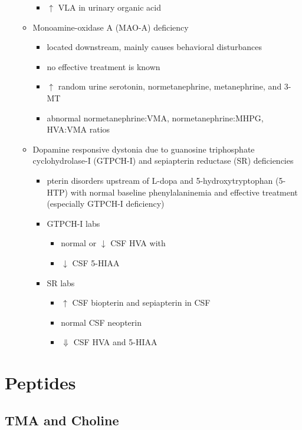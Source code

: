 \documentclass{scrartcl}
\begin{document}
\begin{itemize}
\begin{itemize}
\begin{itemize}
\item \(\uparrow\) VLA in urinary organic acid
\end{itemize}
\item Monoamine-oxidase A (MAO-A) deficiency
\begin{itemize}
\item located downstream, mainly causes behavioral disturbances
\item no effective treatment is known
\item \(\uparrow\) random urine serotonin, normetanephrine, metanephrine, and 3-MT
\item abnormal normetanephrine:VMA, normetanephrine:MHPG, HVA:VMA ratios
\end{itemize}
\item Dopamine responsive dystonia due to guanosine triphosphate cyclohydrolase-I (GTPCH-I) and
sepiapterin reductase (SR) deficiencies
\begin{itemize}
\item pterin disorders upstream of L-dopa and
5-hydroxytryptophan (5-HTP) with normal baseline
phenylalaninemia and effective treatment (especially GTPCH-I
deficiency)
\item GTPCH-I labs
\begin{itemize}
\item normal or \(\downarrow\) CSF HVA with
\item \(\downarrow\) CSF 5-HIAA
\end{itemize}
\item SR labs
\begin{itemize}
\item \(\uparrow\) CSF biopterin and sepiapterin in CSF
\item normal CSF neopterin
\item \(\Downarrow\) CSF HVA and 5-HIAA
\end{itemize}
\end{itemize}
\end{itemize}
\end{itemize}
\section{Peptides}
\label{sec:orge2a0bfc}
\subsection{TMA and Choline}
\label{sec:org6a71034}
\end{document}
